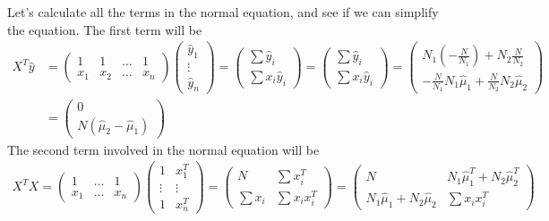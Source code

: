 \documentclass[pra,groupedaddress,amsmath,amssymb, column]{revtex4}
\begin{document}
Let's calculate all the terms in the normal equation, and see if we can simplify the equation.  
The first term will be
\begin{align}
X^T\hat{y}& = \left( \begin{array}{cccc}
	 1  &1      & \dots &1\\
	x_1& x_2 & \dots &x_n
\end{array} \right)
\left( \begin{array}{c}
	\hat{y}_1 \\ \vdots\\\hat{y}_n 
\end{array} \right)=
\left( \begin{array}{c}
	\sum \hat{y}_i\\ \sum x_i \hat{y}_i 
\end{array} \right)=	
\left( \begin{array}{c}
	\sum \hat{y}_i\\ \sum x_i \hat{y}_i 
\end{array} \right)=
\left( \begin{array}{c}
	N_1(-\frac{N}{N_1})+N_2\frac{N}{N_2}\\ -\frac{N}{N_1}N_1\hat{\mu}_1+\frac{N}{N_2}N_2\hat{\mu}_2
\end{array} \right)\\ 
&= 
\left( \begin{array}{c}
	0\\ N(  \hat{\mu}_2-\hat{\mu}_1)
\end{array} \right)
\end{align}
The second term involved in the normal equation will be
\begin{align}
X^TX = \left( \begin{array}{ccc}
	1&\dots&1\\ x_1&\dots&x_n
\end{array} \right)
\left( \begin{array}{cc}
	1 & x_1^T\\
	\vdots&\vdots\\
	1 &x_n^T
\end{array} \right) =
\left( \begin{array}{cc}
	N & \sum x_i^T\\
	\sum x_i & \sum x_i x_i^T
\end{array} \right)=
\left( \begin{array}{cc}
	N & N_1\hat{\mu}_1^T + N_2\hat{\mu}_2^T\\
	N_1\hat{\mu}_1 + N_2\hat{\mu}_2& \sum x_i x_i^T
\end{array} \right)
\end{align}
\end{document}
